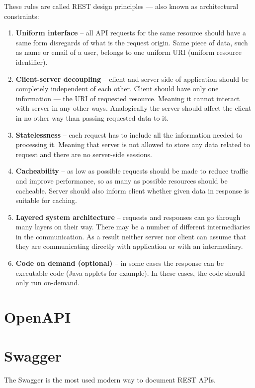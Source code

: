 These rules are called REST design principles --- also known as architectural constraints:
\cite{ibmrest}
\begin{enumerate}
    \item \textbf{Uniform interface} -- all API requests for the same resource should have a same form disregards of what is the request origin. Same piece of data, such as name or email of a user, belongs to one uniform URI (uniform resource identifier).
    \item \textbf{Client-server decoupling} -- client and server side of application should be completely independent of each other. Client should have only one information --- the URI of requested resource. Meaning it cannot interact with server in any other ways. Analogically the server should affect the client in no other way than passing requested data to it.
    \item \textbf{Statelessness} -- each request has to include all the information needed to processing it. Meaning that server is not allowed to store any data related to request and there are no server-side sessions.
    \item \textbf{Cacheability} -- as low as possible requests should be made to reduce traffic and improve performance, so as many as possible resources should be cacheable. Server should also inform client whether given data in response is suitable for caching.
    \item \textbf{Layered system architecture} -- requests and responses can go through many layers on their way. There may be a number of different intermediaries in the communication. As a result neither server nor client can assume that they are communicating directly with application or with an intermediary.
    \item \textbf{Code on demand (optional)} -- in some cases the response can be executable code (Java applets for example). In these cases, the code should only run on-demand.
\end{enumerate}

\section{OpenAPI} \label{sec:openapi}

\section{Swagger} \label{sec:swagger}
The Swagger is the most used modern way to document REST APIs.
\cite{swagger}

